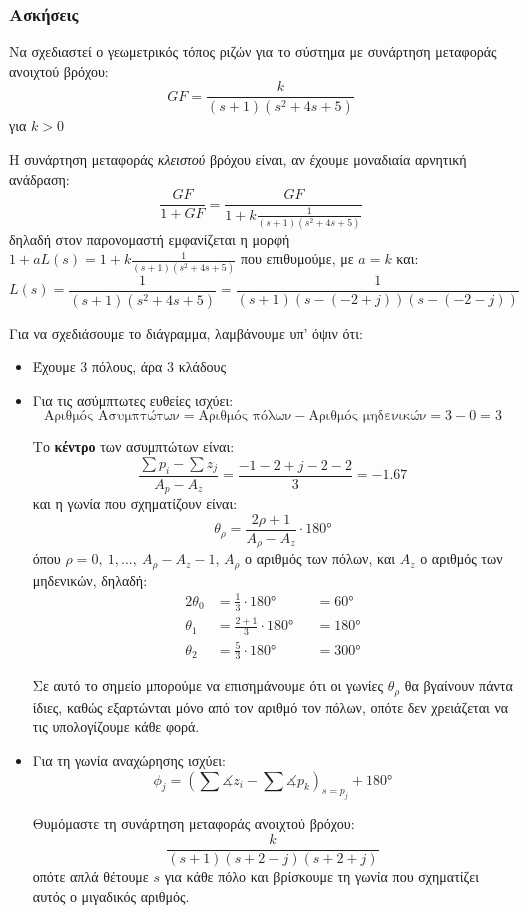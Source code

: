 \documentclass[11pt,a4paper,notitlepage,fleqn,final]{article}
\begin{document}
\subsubsection{Ασκήσεις}
\begin{exercise}
	Να σχεδιαστεί ο γεωμετρικός τόπος ριζών για το σύστημα με συνάρτηση μεταφοράς ανοιχτού βρόχου:
	\[
	GF = \frac{k}{(s+1)(s^2+4s+5)}
	\]
	για \( k>0 \)
	
	\tcblower
	
	Η συνάρτηση μεταφοράς \textit{κλειστού} βρόχου είναι, αν έχουμε μοναδιαία αρνητική
	ανάδραση:
	\[
	\frac{GF}{1+GF} = \frac{GF}{1+k\frac{1}{(s+1)(s^2+4s+5)}}
	\]
	δηλαδή στον παρονομαστή εμφανίζεται η μορφή \( 1+aL(s) = 1+k\frac{1}{(s+1)(s^2+4s+5)} \) που επιθυμούμε, με \( a=k \) και:
	\[
	L(s) = \frac{1}{(s+1)(s^2+4s+5)} = \frac{1}{(s+1)\left( s-(-2+j) \right)\left(s-(-2-j)\right)}
	\]
	
	Για να σχεδιάσουμε το διάγραμμα, λαμβάνουμε υπ' όψιν ότι:
	\begin{itemize}
		\item Έχουμε 3 πόλους, άρα 3 κλάδους
		\item Για τις ασύμπτωτες ευθείες ισχύει:
		\[
		\text{Αριθμός Ασυμπτώτων} = \text{Αριθμός πόλων} - \text{Αριθμός μηδενικών} = 3-0 = 3
		\]
		
		Το \textbf{κέντρο} των ασυμπτώτων είναι:
		\[
		\frac{\sum p_i - \sum z_j}{A_p - A_z} = \frac{-1-2+j-2-2}{3} = -1.67
		\]
		και η γωνία που σχηματίζουν είναι:
		\[
		\theta_ρ = \frac{2ρ+1}{A_ρ-Α_z} \cdot \ang{180}
		\]
		όπου \( ρ = 0,\ 1,\dots,\ A_ρ-A_z-1 \), \( A_ρ \) ο αριθμός των πόλων, και \( A_z \) ο
		αριθμός των μηδενικών, δηλαδή:
		\begin{alignat*}{2}
		\theta_0 &= \frac{1}{3}\cdot\ang{180} &&= \ang{60} \\
		\theta_1 &= \frac{2+1}{3}\cdot\ang{180} &&= \ang{180} \\
		\theta_2 &= \frac{5}{3}\cdot\ang{180} &&= \ang{300}
		\end{alignat*}
		
		Σε αυτό το σημείο μπορούμε να επισημάνουμε ότι οι γωνίες \( \theta_ρ \) θα βγαίνουν
		πάντα ίδιες, καθώς εξαρτώνται μόνο από τον αριθμό τον πόλων, οπότε δεν
		χρειάζεται να τις υπολογίζουμε κάθε φορά.
		\item Για τη γωνία αναχώρησης ισχύει:
		\[
		\phi_j = \left( \sum \measuredangle z_i - \sum \measuredangle p_k \right)_{s=p_j}
		+\ang{180}
		\]
		
		Θυμόμαστε τη συνάρτηση μεταφοράς ανοιχτού βρόχου:
		\[
		\frac{k}{(s+1)(s+2-j)(s+2+j)}
		\]
		οπότε απλά θέτουμε \( s \) για κάθε πόλο και βρίσκουμε τη γωνία που σχηματίζει αυτός
		ο μιγαδικός αριθμός.
		

\end{itemize}
\end{exercise}
\end{document}
